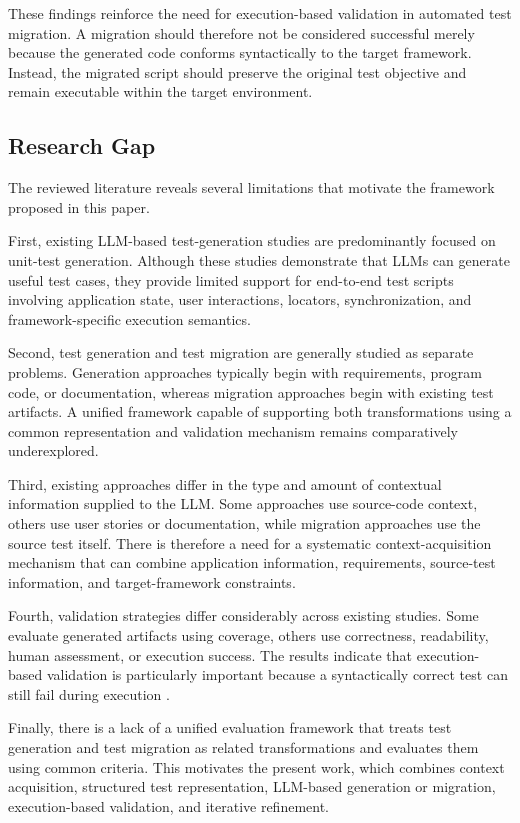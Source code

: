 \documentclass[pdflatex,sn-mathphys-num]{sn-jnl}
\begin{document}
These findings reinforce the need for execution-based validation in
automated test migration. A migration should therefore not be considered
successful merely because the generated code conforms syntactically to the
target framework. Instead, the migrated script should preserve the original
test objective and remain executable within the target environment.

\subsection{Research Gap}
\label{subsec:research-gap}

The reviewed literature reveals several limitations that motivate the
framework proposed in this paper.

First, existing LLM-based test-generation studies are predominantly
focused on unit-test generation. Although these studies demonstrate that
LLMs can generate useful test cases, they provide limited support for
end-to-end test scripts involving application state, user interactions,
locators, synchronization, and framework-specific execution semantics.

Second, test generation and test migration are generally studied as
separate problems. Generation approaches typically begin with requirements,
program code, or documentation, whereas migration approaches begin with
existing test artifacts. A unified framework capable of supporting both
transformations using a common representation and validation mechanism
remains comparatively underexplored.

Third, existing approaches differ in the type and amount of contextual
information supplied to the LLM. Some approaches use source-code context,
others use user stories or documentation, while migration approaches use
the source test itself. There is therefore a need for a systematic
context-acquisition mechanism that can combine application information,
requirements, source-test information, and target-framework constraints.

Fourth, validation strategies differ considerably across existing studies.
Some evaluate generated artifacts using coverage, others use correctness,
readability, human assessment, or execution success. The results indicate
that execution-based validation is particularly important because a
syntactically correct test can still fail during execution
\cite{schafer2024testpilot,yuan2024chatgpt,alves2026migration}.

Finally, there is a lack of a unified evaluation framework that treats
test generation and test migration as related transformations and evaluates
them using common criteria. This motivates the present work, which combines
context acquisition, structured test representation, LLM-based generation
or migration, execution-based validation, and iterative refinement.
\end{document}

